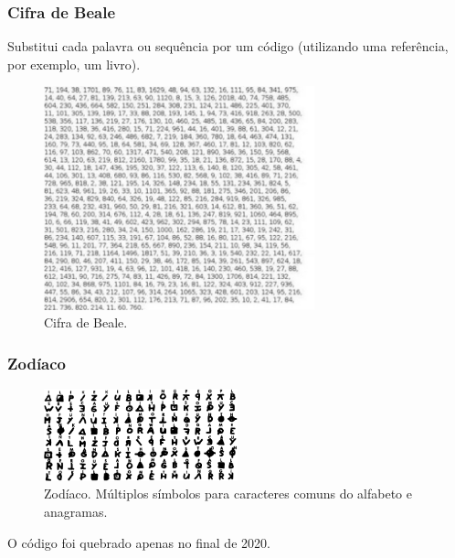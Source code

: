 \begin{frame}
\frametitle{Cifra de Beale}
Substitui cada palavra ou sequência por um código (utilizando uma referência, por exemplo, um livro).

\begin{figure}[h]
\centering
\includegraphics[width=0.7\textwidth,height=0.5\textheight,keepaspectratio]{figures/beale.jpg}
\caption{Cifra de Beale.}
\label{fig-beale}
\end{figure}

\end{frame}






\begin{frame}[allowframebreaks]
\frametitle{Zodíaco}

\begin{figure}[h]
\centering
\includegraphics[width=0.5\textwidth,height=0.5\textheight,keepaspectratio]{figures/zodiaccipher.png}
\caption{Zodíaco. Múltiplos símbolos para caracteres comuns do alfabeto e anagramas.}
\label{fig-zodiac}
\end{figure}

O código foi quebrado apenas no final de 2020.\\

\vspace{2ex}

\end{frame}


